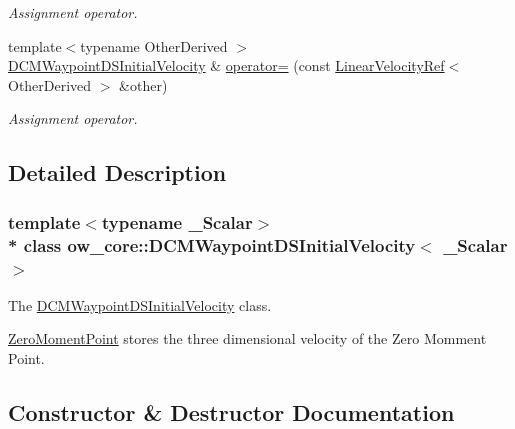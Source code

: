 \begin{DoxyCompactItemize}
\begin{DoxyCompactList}\small\item\em Assignment operator. \end{DoxyCompactList}\item 
{\footnotesize template$<$typename Other\+Derived $>$ }\\\hyperlink{classow__core_1_1DCMWaypointDSInitialVelocity}{D\+C\+M\+Waypoint\+D\+S\+Initial\+Velocity} \& \hyperlink{classow__core_1_1DCMWaypointDSInitialVelocity_a76a039e82e4271e13d38c8bb08a34bf4}{operator=} (const \hyperlink{classow__core_1_1LinearVelocityRef}{Linear\+Velocity\+Ref}$<$ Other\+Derived $>$ \&other)\hypertarget{classow__core_1_1DCMWaypointDSInitialVelocity_a76a039e82e4271e13d38c8bb08a34bf4}{}\label{classow__core_1_1DCMWaypointDSInitialVelocity_a76a039e82e4271e13d38c8bb08a34bf4}

\begin{DoxyCompactList}\small\item\em Assignment operator. \end{DoxyCompactList}\end{DoxyCompactItemize}


\subsection{Detailed Description}
\subsubsection*{template$<$typename \+\_\+\+Scalar$>$\\*
class ow\+\_\+core\+::\+D\+C\+M\+Waypoint\+D\+S\+Initial\+Velocity$<$ \+\_\+\+Scalar $>$}

The \hyperlink{classow__core_1_1DCMWaypointDSInitialVelocity}{D\+C\+M\+Waypoint\+D\+S\+Initial\+Velocity} class. 

\hyperlink{classow__core_1_1ZeroMomentPoint}{Zero\+Moment\+Point} stores the three dimensional velocity of the Zero Momment Point. 

\subsection{Constructor \& Destructor Documentation}
